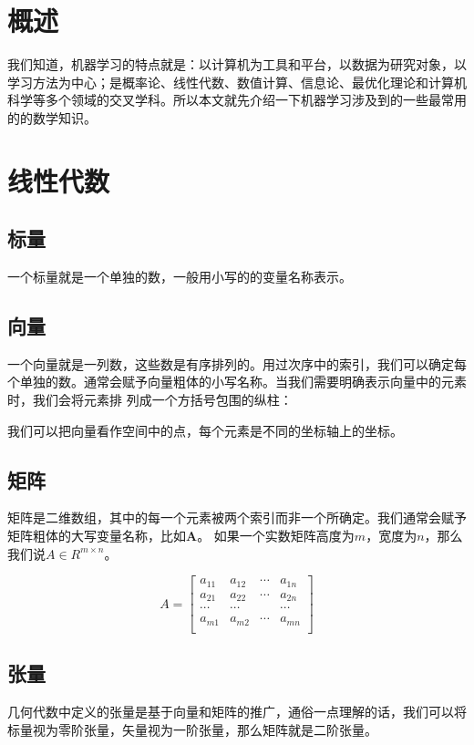 \documentclass[11pt]{book}
\newcounter{#2}
\newcounter{#2}[#1]
\numberwithin{#2}{#1}
\begin{document}
\section{概述}
我们知道，机器学习的特点就是：以计算机为工具和平台，以数据为研究对象，以学习方法为中心；是概率论、线性代数、数值计算、信息论、最优化理论和计算机科学等多个领域的交叉学科。所以本文就先介绍一下机器学习涉及到的一些最常用的的数学知识。
\section{线性代数}
\subsection{标量}
一个标量就是一个单独的数，一般用小写的的变量名称表示。
\subsection{向量}
一个向量就是一列数，这些数是有序排列的。用过次序中的索引，我们可以确定每个单独的数。通常会赋予向量粗体的小写名称。当我们需要明确表示向量中的元素时，我们会将元素排
列成一个方括号包围的纵柱：

我们可以把向量看作空间中的点，每个元素是不同的坐标轴上的坐标。

\subsection{矩阵}
矩阵是二维数组，其中的每一个元素被两个索引而非一个所确定。我们通常会赋予矩阵粗体的大写变量名称，比如\textbf{A}。 如果一个实数矩阵高度为$ m $，宽度为$ n $，那么我们说$ A \in R^{m \times n} $。
\begin{center}
	\begin{equation}
  A= \begin{bmatrix} a_{11} & a_{12} & \cdots & a_{1n}\\ a_{21} & a_{22} & \cdots & a_{2n}\\ \cdots & \cdots & & \cdots\\ a_{m1} & a_{m2} & \cdots & a_{mn}\\ \end{bmatrix}
  \end{equation}
\end{center}
\subsection{张量}
几何代数中定义的张量是基于向量和矩阵的推广，通俗一点理解的话，我们可以将标量视为零阶张量，矢量视为一阶张量，那么矩阵就是二阶张量。
\end{document}
